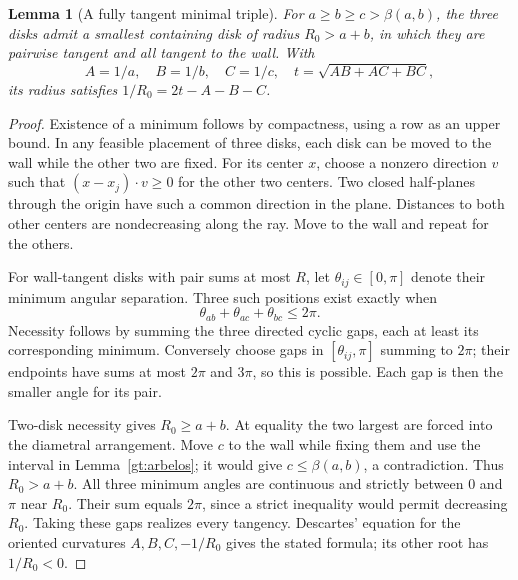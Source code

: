 \documentclass[11pt]{article}
\newtheorem{lemma}[theorem]{Lemma}
\theoremstyle{definition}
\begin{document}
\begin{lemma}[A fully tangent minimal triple]\label{gt:minimal}
For $a\ge b\ge c>\beta(a,b)$, the three disks admit a smallest
containing disk of radius $R_0>a+b$, in which they are pairwise tangent
and all tangent to the wall. With
\[
 A=1/a,\quad B=1/b,\quad C=1/c,\quad t=\sqrt{AB+AC+BC},
\]
its radius satisfies $1/R_0=2t-A-B-C$.
\end{lemma}
\begin{proof}
Existence of a minimum follows by compactness, using a row as an upper
bound. In any feasible placement of three disks, each disk can be moved
to the wall while the other two are fixed. For its center $x$, choose
a nonzero direction $v$ such that $(x-x_j)\cdot v\ge0$ for the
other two centers. Two closed half-planes through the origin have such
a common direction in the plane. Distances to both other centers are
nondecreasing along the ray. Move to the wall and repeat for the others.

For wall-tangent disks with pair sums at most $R$, let
$\theta_{ij}\in[0,\pi]$ denote their minimum angular separation.
Three such positions exist exactly when
\[
 \theta_{ab}+\theta_{ac}+\theta_{bc}\le2\pi.
\]
Necessity follows by summing the three directed cyclic gaps, each at
least its corresponding minimum. Conversely choose gaps in
$[\theta_{ij},\pi]$ summing to $2\pi$; their endpoints have sums
at most $2\pi$ and $3\pi$, so this is possible. Each gap is then
the smaller angle for its pair.

Two-disk necessity gives $R_0\ge a+b$. At equality the two largest
are forced into the diametral arrangement. Move $c$ to the wall while
fixing them and use the interval in Lemma~\ref{gt:arbelos}; it would
give $c\le\beta(a,b)$, a contradiction. Thus $R_0>a+b$. All three
minimum angles are continuous and strictly between $0$ and $\pi$
near $R_0$. Their sum equals $2\pi$, since a strict inequality would
permit decreasing $R_0$. Taking these gaps realizes every tangency.
Descartes' equation for the oriented curvatures $A,B,C,-1/R_0$ gives
the stated formula; its other root has $1/R_0<0$.
\end{proof}
\end{document}
